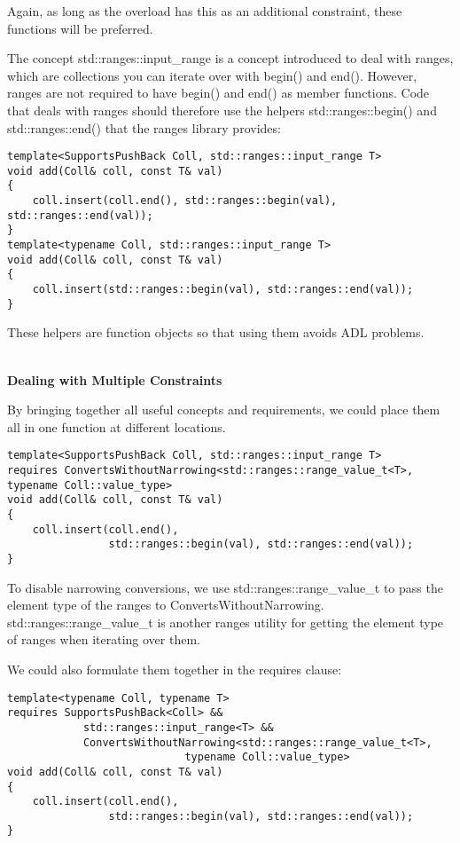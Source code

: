 Again, as long as the overload has this as an additional constraint, these functions will be preferred.

The concept std::ranges::input\_range is a concept introduced to deal with ranges, which are collections you can iterate over with begin() and end(). However, ranges are not required to have begin() and end() as member functions. Code that deals with ranges should therefore use the helpers std::ranges::begin() and std::ranges::end() that the ranges library provides:

\begin{lstlisting}[style=styleCXX]
template<SupportsPushBack Coll, std::ranges::input_range T>
void add(Coll& coll, const T& val)
{
	coll.insert(coll.end(), std::ranges::begin(val), std::ranges::end(val));
}
template<typename Coll, std::ranges::input_range T>
void add(Coll& coll, const T& val)
{
	coll.insert(std::ranges::begin(val), std::ranges::end(val));
}
\end{lstlisting}

These helpers are function objects so that using them avoids ADL problems.

\noindent
\hspace*{\fill} \\ %
\textbf{Dealing with Multiple Constraints}

By bringing together all useful concepts and requirements, we could place them all in one function at different locations.

\begin{lstlisting}[style=styleCXX]
template<SupportsPushBack Coll, std::ranges::input_range T>
requires ConvertsWithoutNarrowing<std::ranges::range_value_t<T>,
typename Coll::value_type>
void add(Coll& coll, const T& val)
{
	coll.insert(coll.end(),
				std::ranges::begin(val), std::ranges::end(val));
}
\end{lstlisting}

To disable narrowing conversions, we use std::ranges::range\_value\_t to pass the element type of the ranges to ConvertsWithoutNarrowing. std::ranges::range\_value\_t is another ranges utility for getting the element type of ranges when iterating over them.

We could also formulate them together in the requires clause:

\begin{lstlisting}[style=styleCXX]
template<typename Coll, typename T>
requires SupportsPushBack<Coll> &&
			std::ranges::input_range<T> &&
			ConvertsWithoutNarrowing<std::ranges::range_value_t<T>,
							typename Coll::value_type>
void add(Coll& coll, const T& val)
{
	coll.insert(coll.end(),
				std::ranges::begin(val), std::ranges::end(val));
}
\end{lstlisting}

